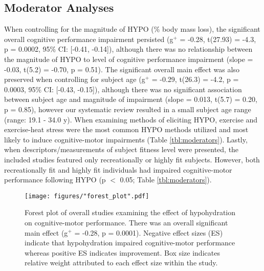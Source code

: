 \subsection{Moderator Analyses}
When controlling for the magnitude of HYPO (\% body mass loss), the significant overall cognitive performance impairment persisted (g${^+}$ = -0.28, t(27.93) = -4.3, p = 0.0002, 95\% CI: [-0.41, -0.14]), although there was no relationship between the magnitude of HYPO to level of cognitive performance impairment (slope = -0.03, t(5.2) = -0.70, p = 0.51). The significant overall main effect was also preserved when controlling for subject age (g${^+}$ = -0.29, t(26.3) = -4.2, p = 0.0003, 95\% CI: [-0.43, -0.15]), although there was no significant association between subject age and magnitude of impairment (slope = 0.013, t(5.7) = 0.20, p = 0.85), however our systematic review resulted in a small subject age range (range: 19.1 - 34.0 y). When examining methods of eliciting HYPO, exercise and exercise-heat stress were the most common HYPO methods utilized and most likely to induce cognitive-motor impairments (Table \ref{tbl:moderators}). Lastly, when descriptors/measurements of subject fitness level were presented, the included studies featured only recreationally or highly fit subjects. However, both recreationally fit and highly fit individuals had impaired cognitive-motor performance following HYPO (p ${<}$ 0.05; Table \ref{tbl:moderators}).  

\begin{figure}
	\centering
	\texttt{[image: figures/"forest\_plot".pdf]}
	\caption{Forest plot of overall studies examining the effect of hypohydration on cognitive-motor performance. There was an overall significant main effect (g${^+}$ = -0.28, p = 0.0001). Negative effect sizes (ES) indicate that hypohydration impaired cognitive-motor performance whereas positive ES indicates improvement. Box size indicates relative weight attributed to each effect size within the study.}
	\label{fig:forest_plot}
\end{figure}

